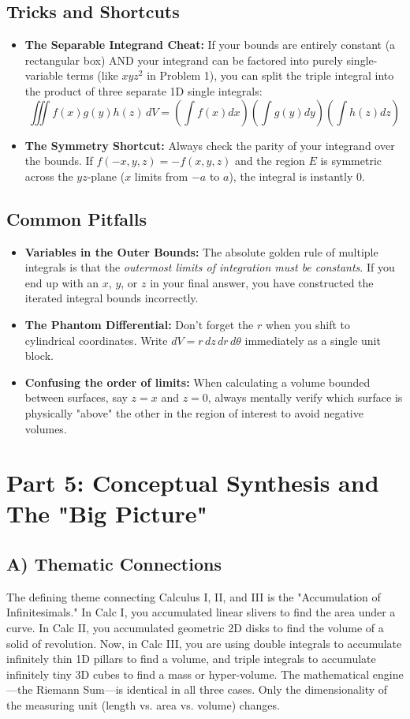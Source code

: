 \documentclass[12pt]{article}
\begin{document}
\subsection{Tricks and Shortcuts}
\begin{itemize}
    \item \textbf{The Separable Integrand Cheat:} If your bounds are entirely constant (a rectangular box) AND your integrand can be factored into purely single-variable terms (like $xyz^2$ in Problem 1), you can split the triple integral into the product of three separate 1D single integrals:
    \[ \iiint f(x)g(y)h(z) \, dV = \left(\int f(x)dx\right)\left(\int g(y)dy\right)\left(\int h(z)dz\right) \]
    \item \textbf{The Symmetry Shortcut:} Always check the parity of your integrand over the bounds. If $f(-x, y, z) = -f(x, y, z)$ and the region $E$ is symmetric across the $yz$-plane ($x$ limits from $-a$ to $a$), the integral is instantly $0$.
\end{itemize}

\subsection{Common Pitfalls}
\begin{itemize}
    \item \textbf{Variables in the Outer Bounds:} The absolute golden rule of multiple integrals is that the \textit{outermost limits of integration must be constants}. If you end up with an $x$, $y$, or $z$ in your final answer, you have constructed the iterated integral bounds incorrectly.
    \item \textbf{The Phantom Differential:} Don't forget the $r$ when you shift to cylindrical coordinates. Write $dV = r \, dz \, dr \, d\theta$ immediately as a single unit block.
    \item \textbf{Confusing the order of limits:} When calculating a volume bounded between surfaces, say $z=x$ and $z=0$, always mentally verify which surface is physically "above" the other in the region of interest to avoid negative volumes.
\end{itemize}

\newpage
\section{Part 5: Conceptual Synthesis and The "Big Picture"}

\subsection{A) Thematic Connections}
The defining theme connecting Calculus I, II, and III is the "Accumulation of Infinitesimals." In Calc I, you accumulated linear slivers to find the area under a curve. In Calc II, you accumulated geometric 2D disks to find the volume of a solid of revolution. Now, in Calc III, you are using double integrals to accumulate infinitely thin 1D pillars to find a volume, and triple integrals to accumulate infinitely tiny 3D cubes to find a mass or hyper-volume. 
The mathematical engine—the Riemann Sum—is identical in all three cases. Only the dimensionality of the measuring unit (length vs. area vs. volume) changes.
\end{document}
